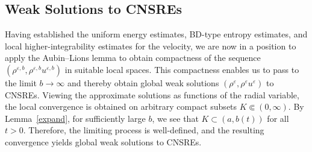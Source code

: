 \documentclass[reqno,11pt]{amsart}
\numberwithin{equation}{section}
\theoremstyle{definition}
\def\v{\varepsilon}
\begin{document}
\subsection{Weak Solutions to CNSREs}\label{weaksub}
Having established the uniform energy estimates, BD-type entropy estimates, 
and local higher-integrability estimates for the velocity, 
we are now in a position to apply the Aubin–Lions lemma to obtain compactness of the sequence
$(\rho^{\v,b},\rho^{\v,b} u^{\v,b})$ in suitable local spaces. 
This compactness enables us to pass to the limit $b\to\infty$ and thereby obtain global weak solutions
$(\rho^{\v},\rho^{\v} u^{\v})$ to CNSREs. 
Viewing the approximate solutions as functions of the radial variable, 
the local convergence is obtained on arbitrary compact subsets
$K \Subset (0,\infty)$. 
By Lemma~\ref{expand}, for sufficiently large $b$, we see that
 $K \subset (a,b(t))$ for all $t > 0$. 
 Therefore, the limiting process is well-defined, 
 and the resulting convergence yields global weak solutions to CNSREs.
\end{document}
